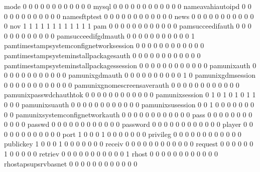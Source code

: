 \documentclass[compress,8pt]{beamer}
\begin{document}
\begin{frame}
\begin{Schunk}
  mode                                      0  0  0  0  0  0  0  0  0  0  0  0
  mysql                                     0  0  0  0  0  0  0  0  0  0  0  0
  nameavahiautoipd                          0  0  0  0  0  0  0  0  0  0  0  0
  namesftptest                              0  0  0  0  0  0  0  0  0  0  0  0
  news                                      0  0  0  0  0  0  0  0  0  0  0  0
  nov                                       1  1  1  1  1  1  1  1  1  1  1  1
  pam                                       0  0  0  0  0  0  0  0  0  0  0  0
  pamsucceedifauth                          0  0  0  0  0  0  0  0  0  0  0  0
  pamsucceedifgdmauth                       0  0  0  0  0  0  0  0  0  0  0  1
  pamtimestampsystemconfignetworksession    0  0  0  0  0  0  0  0  0  0  0  0
  pamtimestampsysteminstallpackagesauth     0  0  0  0  0  0  0  0  0  0  0  0
  pamtimestampsysteminstallpackagessession  0  0  0  0  0  0  0  0  0  0  0  0
  pamunixauth                               0  0  0  0  0  0  0  0  0  0  0  0
  pamunixgdmauth                            0  0  0  0  0  0  0  0  0  0  1  0
  pamunixgdmsession                         0  0  0  0  0  0  0  0  0  0  0  0
  pamunixgnomescreensaverauth               0  0  0  0  0  0  0  0  0  0  0  0
  pamunixpasswdchauthtok                    0  0  0  0  0  0  0  0  0  0  0  0
  pamunixsession                            0  1  0  1  0  1  0  1  1  0  0  0
  pamunixsuauth                             0  0  0  0  0  0  0  0  0  0  0  0
  pamunixsusession                          0  0  1  0  0  0  0  0  0  0  0  0
  pamunixsystemconfignetworkauth            0  0  0  0  0  0  0  0  0  0  0  0
  pass                                      0  0  0  0  0  0  0  0  0  0  0  0
  passwd                                    0  0  0  0  0  0  0  0  0  0  0  0
  password                                  0  0  0  0  0  0  0  0  0  0  0  0
  player                                    0  0  0  0  0  0  0  0  0  0  0  0
  port                                      1  0  0  0  1  0  0  0  0  0  0  0
  privileg                                  0  0  0  0  0  0  0  0  0  0  0  0
  publickey                                 1  0  0  0  1  0  0  0  0  0  0  0
  receiv                                    0  0  0  0  0  0  0  0  0  0  0  0
  request                                   0  0  0  0  0  0  1  0  0  0  0  0
  retriev                                   0  0  0  0  0  0  0  0  0  0  0  1
  rhost                                     0  0  0  0  0  0  0  0  0  0  0  0
  rhostapsupsrvbasnet                       0  0  0  0  0  0  0  0  0  0  0  0

\end{Schunk}
\end{frame}
\end{document}
